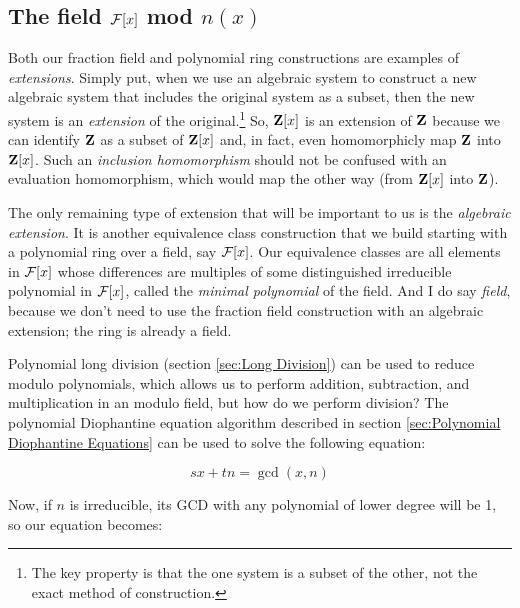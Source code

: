 \begin{comment}

\mysection{Linear Algebra}
\qquad [van der Waerden], Ch. 4, \S6.11 (trace of an field extension)

Determinants; trace.

\end{comment}

\subsection*{\qquad The field ${\cal F}[x]$ mod $n(x)$}

Both our fraction field and polynomial ring constructions are examples
of {\it extensions}.  Simply put, when we use an algebraic system to
construct a new algebraic system that includes the original system as
a subset, then the new system is an {\it extension} of the
original.\footnote{The key property is that the one system is a subset
of the other, not the exact method of construction.}  So, ${\bf Z}[x]$
is an extension of ${\bf Z}$ because we can identify ${\bf Z}$ as a
subset of ${\bf Z}[x]$ and, in fact, even homomorphicly map ${\bf Z}$
into ${\bf Z}[x]$.  Such an {\it inclusion homomorphism} should not be
confused with an evaluation homomorphism, which would map the other
way (from ${\bf Z}[x]$ into ${\bf Z}$).

The only remaining type of extension that will be important to us is
the {\it algebraic extension}.  It is another equivalence class
construction that we build starting with a polynomial ring over a
field, say ${\cal F}[x]$.  Our equivalence classes are all elements in
${\cal F}[x]$ whose differences are multiples of some distinguished
irreducible polynomial in ${\cal F}[x]$, called the {\it minimal
polynomial} of the field.  And I do say {\it field}, because we don't
need to use the fraction field construction with an algebraic
extension; the ring is already a field.

Polynomial long division (section \ref{sec:Long Division})
can be used to reduce modulo polynomials, which allows
us to perform addition, subtraction, and multiplication
in an modulo field, but how do we perform division?
The polynomial Diophantine equation algorithm
described in section \ref{sec:Polynomial Diophantine Equations}
can be used to solve the following equation:

$$sx + tn = \gcd(x,n)$$

Now, if $n$ is irreducible, its GCD with any polynomial
of lower degree will be 1, so our equation becomes:

